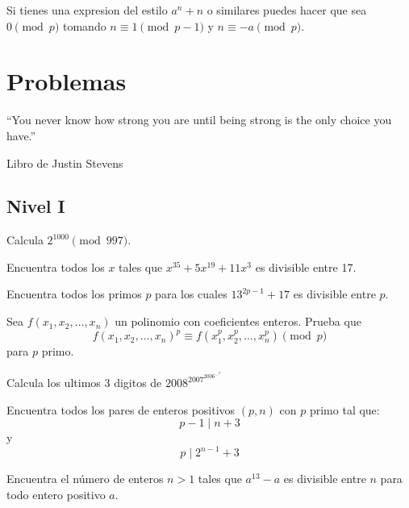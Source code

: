 \documentclass[11pt]{scrartcl}
\newcommand{\thmdifficulty}{0}
\newcommand{\problemdiff}[1]{\renewcommand{\thmdifficulty}{#1}}
\begin{document}
Si tienes una expresion del estilo $a^n+n$ o similares puedes hacer que sea $0 \pmod p $ tomando $n \equiv 1 \pmod{p-1}$ y $n \equiv -a \pmod p$.  



\newpage 
\section{Problemas}
\epigraph{“You never know how strong you are until being strong is the only choice you have.”}{Libro de Justin Stevens}
    
\subsection{Nivel I}

\problemdiff{1}
\begin{problem}
Calcula $2^{1000} \pmod {997}$.
\end{problem}

\problemdiff{1}

\begin{problem}
Encuentra todos los $x$ tales que $x^{35}+5x^{19}+11x^{3}$ es divisible entre 17.
\end{problem}

\problemdiff{1}
\begin{problem}
Encuentra todos los primos $p$ para los cuales $13^{2p-1}+17$ es divisible entre $p$.
\end{problem}

\problemdiff{2}
\begin{problem}
Sea $f(x_1,x_2,\ldots, x_n)$ un polinomio con coeficientes enteros. Prueba que 
$$f(x_1,x_2, \ldots ,x_n)^p \equiv f(x_1^p,x_2^p, \ldots, x_n^p) \pmod p$$
para $p$ primo.
\end{problem}

\problemdiff{2}
\begin{problem}
    Calcula los ultimos 3 digitos de $2008^{2007^{2006^{\ldots^{2^1}}}}$
\end{problem}


\problemdiff{3}
\begin{problem}
    Encuentra todos los pares de enteros positivos $(p,n)$ con $p$ primo tal que: 
    \[p-1 \mid n+3\]
    y 
    \[p \mid 2^{n-1}+3\]
\end{problem}

\problemdiff{3}
\begin{problem}
    Encuentra el número de enteros $n>1$ tales que $a^{13}-a$ es divisible entre $n$ para todo entero positivo $a$. 
\end{problem}
\end{document}

